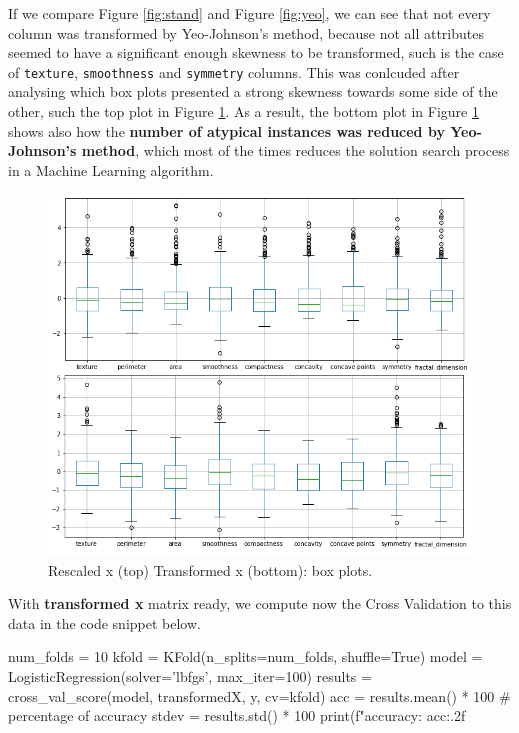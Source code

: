 \documentclass[11pt]{article}
\begin{document}
If we compare Figure \ref{fig:stand} and Figure \ref{fig:yeo}, we can see that not every column was transformed by Yeo-Johnson's method, because not all attributes seemed to have a significant enough skewness to be transformed, such is the case of \verb$texture$,  \verb$smoothness$ and  \verb$symmetry$ columns. This was conlcuded after analysing which box plots presented a strong skewness towards some side of the other, such the top plot in Figure \ref{fig:boxplots}. As a result, the bottom plot in Figure \ref{fig:boxplots} shows also how the \textbf{number of atypical instances was reduced by Yeo-Johnson's method}, which most of the times reduces the solution search process in a Machine Learning algorithm.
\\

\begin{figure}[!ht]
\centering
    \includegraphics[width=5.5in]{box-plots.png}
    \caption{Rescaled x (top) Transformed x (bottom): box plots.}
    \label{fig:boxplots}
\end{figure}

With \textbf{transformed x} matrix ready, we compute now the Cross Validation to this data in the code snippet below.
\\

\begin{python}
num_folds = 10
kfold = KFold(n_splits=num_folds, shuffle=True) 
model = LogisticRegression(solver='lbfgs', max_iter=100)
results = cross_val_score(model, transformedX, y, cv=kfold)
acc = results.mean() * 100 # percentage of accuracy
stdev = results.std() * 100
print(f"accuracy: {acc:.2f}%
\end{python}
\end{document}
